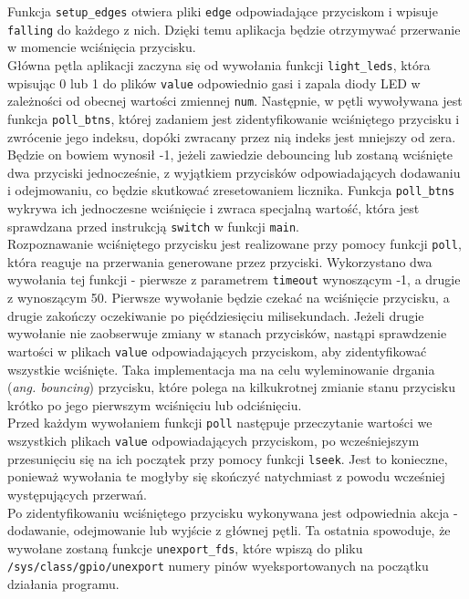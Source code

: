 \documentclass[10pt,a4paper]{article}
\begin{document}
Funkcja \texttt{setup\_edges} otwiera pliki \texttt{edge} odpowiadające przyciskom i wpisuje \texttt{falling} do każdego z nich. Dzięki temu aplikacja będzie otrzymywać przerwanie w momencie wciśnięcia przycisku.\\[\baselineskip]
Główna pętla aplikacji zaczyna się od wywołania funkcji \texttt{light\_leds}, która wpisując 0 lub 1 do plików \texttt{value} odpowiednio gasi i zapala diody LED w zależności od obecnej wartości zmiennej \texttt{num}. Następnie, w pętli wywoływana jest funkcja \texttt{poll\_btns}, której zadaniem jest zidentyfikowanie wciśniętego przycisku i zwrócenie jego indeksu, dopóki zwracany przez nią indeks jest mniejszy od zera. Będzie on bowiem wynosił -1, jeżeli zawiedzie debouncing lub zostaną wciśnięte dwa przyciski jednocześnie, z wyjątkiem przycisków odpowiadających dodawaniu i odejmowaniu, co będzie skutkować zresetowaniem licznika. Funkcja \texttt{poll\_btns} wykrywa ich jednoczesne wciśnięcie i zwraca specjalną wartość, która jest sprawdzana przed instrukcją \texttt{switch} w funkcji \texttt{main}.\\[\baselineskip]
Rozpoznawanie wciśniętego przycisku jest realizowane przy pomocy funkcji \texttt{poll}, która reaguje na przerwania generowane przez przyciski. Wykorzystano dwa wywołania tej funkcji - pierwsze z parametrem \texttt{timeout} wynoszącym -1, a drugie z wynoszącym 50. Pierwsze wywołanie będzie czekać na wciśnięcie przycisku, a drugie zakończy oczekiwanie po pięćdziesięciu milisekundach. Jeżeli drugie wywołanie nie zaobserwuje zmiany w stanach przycisków, nastąpi sprawdzenie wartości w plikach \texttt{value} odpowiadających przyciskom, aby zidentyfikować wszystkie wciśnięte. Taka implementacja ma na celu wyleminowanie drgania (\textit{ang. bouncing}) przycisku, które polega na kilkukrotnej zmianie stanu przycisku krótko po jego pierwszym wciśnięciu lub odciśnięciu.\\[\baselineskip]
Przed każdym wywołaniem funkcji \texttt{poll} następuje przeczytanie wartości we wszystkich plikach \texttt{value} odpowiadających przyciskom, po wcześniejszym przesunięciu się na ich początek przy pomocy funkcji \texttt{lseek}. Jest to konieczne, ponieważ wywołania te mogłyby się skończyć natychmiast z powodu wcześniej występujących przerwań.\\[\baselineskip]
Po zidentyfikowaniu wciśniętego przycisku wykonywana jest odpowiednia akcja - dodawanie, odejmowanie lub wyjście z głównej pętli. Ta ostatnia spowoduje, że wywołane zostaną funkcje \texttt{unexport\_fds}, które wpiszą do pliku \texttt{/sys/class/gpio/unexport} numery pinów wyeksportowanych na początku działania programu.
\end{document}
